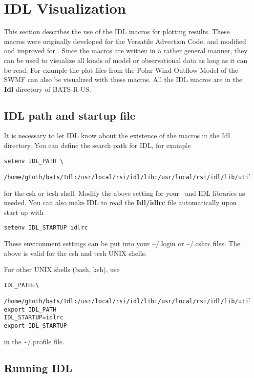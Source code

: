 %

\section{IDL Visualization \label{section:idl_visualization}}

This section describes the use of the IDL macros for plotting results.
These macros were originally developed for the Versatile Advection Code,
and modified and improved for \BATSRUS. Since the macros are written
in a rather general manner, they can be used to visualize all kinds
of model or observational data as long as it can be read. For example
the plot files from the Polar Wind Outflow Model of the SWMF can 
also be visualized with these macros.
All the IDL macros are in the {\bf Idl} directory of BATS-R-US.

\subsection{IDL path and startup file \label{s-idl-path}}

   It is necessary to let IDL know about the existence of the macros in the 
   Idl directory.  You can define the search path for IDL, for example
\begin{verbatim}
setenv IDL_PATH \
 /home/gtoth/bats/Idl:/usr/local/rsi/idl/lib:/usr/local/rsi/idl/lib/utilities
\end{verbatim}
   for the csh or tcsh shell. Modify the above setting for
   your \BATSRUS\ and IDL libraries as needed. You can also make IDL to read 
   the {\bf Idl/idlrc} file automatically upon start up with
\begin{verbatim}
setenv IDL_STARTUP idlrc
\end{verbatim}
   These environment settings can be put into your \~{}/.login or \~{}/.cshrc 
   files. The above is valid for the csh and tcsh UNIX shells. 

   For other UNIX shells (bash, ksh), use
\begin{verbatim}
IDL_PATH=\
 /home/gtoth/bats/Idl:/usr/local/rsi/idl/lib:/usr/local/rsi/idl/lib/utilities
export IDL_PATH
IDL_STARTUP=idlrc
export IDL_STARTUP
\end{verbatim}
   in the \~{}/.profile file.

\subsection{Running IDL \label{s-run-idl}}

